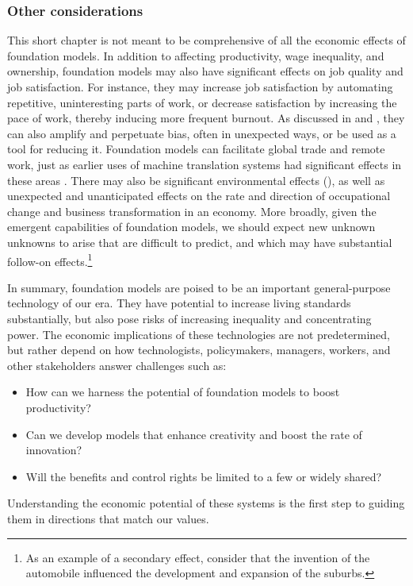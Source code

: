 \subsubsection{Other considerations}
This short chapter is not meant to be comprehensive of all the economic effects of foundation models. 
In addition to affecting productivity, wage inequality, and ownership, 
foundation models may also have significant effects on job quality and job satisfaction.
For instance, they may increase job satisfaction by automating repetitive, uninteresting parts of work, or decrease satisfaction by increasing the pace of work, thereby inducing more frequent burnout.  
As discussed in  and , they can also amplify and perpetuate bias, often in unexpected ways, or be used as a tool for reducing it.  
Foundation models can facilitate global trade and remote work,
just as earlier uses of machine translation systems had significant effects in these areas \citep[\eg][]{Brynjolfsson2019}.
There may also be significant environmental effects (), as well as unexpected and unanticipated effects on the rate and direction of occupational change and business transformation in an economy. 
More broadly, given the emergent capabilities of foundation models, we should expect new unknown unknowns to arise that are difficult to predict, and which may have substantial follow-on effects.\footnote{As an example of a secondary effect, consider that the invention of the automobile influenced the development and expansion of the suburbs.}
 
In summary, foundation models are poised to be an important general-purpose technology of our era.
They have potential to increase living standards substantially, but also pose risks of increasing inequality and concentrating power.
The economic implications of these technologies are not predetermined, but rather depend on how technologists, policymakers, managers, workers, and other stakeholders answer challenges such as:
\begin{itemize} 
\item   How can we harness the potential of foundation models to boost productivity?
\item  	Can we develop models that enhance creativity and boost the rate of innovation?
\item   Will the benefits and control rights be limited to a few or widely shared?
\end{itemize}
Understanding the economic potential of these systems is the first step to guiding them in directions that match our values.


 